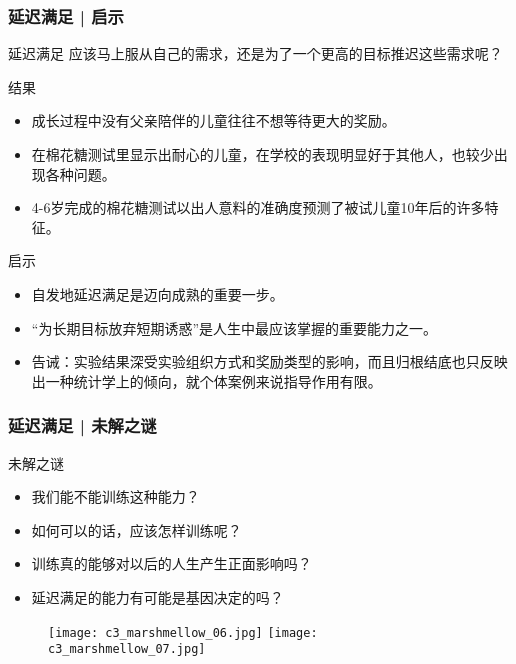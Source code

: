 \begin{frame}
  \frametitle{延迟满足 | 启示}
  \begin{block}{延迟满足}
    应该马上服从自己的需求，还是为了一个更高的目标推迟这些需求呢？
  \end{block}
  \vspace{-0.5em}
  \pause
  \begin{block}{结果}
    \begin{itemize}
      \item 成长过程中没有\alert{父亲陪伴}的儿童往往不想等待更大的奖励。
      \item 在棉花糖测试里显示出耐心的儿童，在学校的表现明显好于其他人，也较少出现各种问题。
      \item 4-6岁完成的棉花糖测试以出人意料的准确度预测了被试儿童10年后的许多特征。
    \end{itemize}
  \end{block}
  \vspace{-0.5em}
  \pause
  \begin{block}{启示}
    \begin{itemize}
      \item 自发地延迟满足是迈向成熟的重要一步。
      \item \alert{“为长期目标放弃短期诱惑”是人生中最应该掌握的重要能力之一。}
      \item 告诫：实验结果深受实验组织方式和奖励类型的影响，而且归根结底也只反映出一种统计学上的倾向，就个体案例来说指导作用有限。
    \end{itemize}
  \end{block}
\end{frame}

\begin{frame}
  \frametitle{延迟满足 | 未解之谜}
  \begin{block}{未解之谜}
    \begin{itemize}
      \item 我们能不能训练这种能力？
      \item 如何可以的话，应该怎样训练呢？
      \item 训练真的能够对以后的人生产生正面影响吗？
      \item 延迟满足的能力有可能是基因决定的吗？
    \end{itemize}
  \end{block}
  \begin{figure}
    \centering
    \texttt{[image: c3\_marshmellow\_06.jpg]}\quad
    \texttt{[image: c3\_marshmellow\_07.jpg]}
  \end{figure}
\end{frame}

